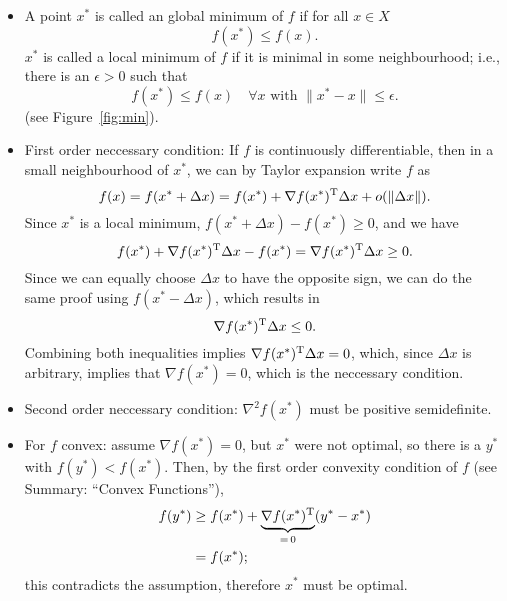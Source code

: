 \documentclass{article}
\begin{document}
\begin{itemize}
\item A point \(x^*\) is called an global minimum of \(f\) if for all \(x \in X\)
  \begin{equation*}
    f(x^*) \leq f(x).
  \end{equation*}
  \(x^*\) is called a local minimum of \(f\) if it is minimal in some neighbourhood; i.e., there is
  an \(\epsilon > 0\) such that
  \begin{equation*}
    f(x^*) \leq f(x) \quad \forall x \text{ with } \lVert x^* - x \rVert \leq \epsilon.
  \end{equation*}
  (see Figure~\ref{fig:min}).
\item First order neccessary condition: If \(f\) is continuously differentiable, then in a small
  neighbourhood of \(x^*\), we can by Taylor expansion write \(f\) as
  \begin{equation*}
    f(x) = f(x^* + \Delta x) = f(x^*) + \nabla f(x^*)^{\mathrm{T}} \Delta x + o(\lVert \Delta x \rVert).
  \end{equation*}
  Since \(x^*\) is a local minimum, \(f(x^* + \Delta x) - f(x^*) \geq 0\), and we have
  \begin{equation*}
    f(x^*) + \nabla f(x^*)^{\mathrm{T}} \Delta x - f(x^*) = \nabla f(x^*)^{\mathrm{T}} \Delta x \geq 0.
  \end{equation*}
  Since we can equally choose \(\Delta x\) to have the opposite sign, we can do the same proof using
  \(f(x^* - \Delta x)\), which results in
  \begin{equation*}
    \nabla f(x^*)^{\mathrm{T}} \Delta x \leq 0.
  \end{equation*}
  Combining both inequalities implies \(\nabla f(x^*)^{\mathrm{T}} \Delta x = 0\), which, since \(\Delta x\)
  is arbitrary, implies that \(\nabla f(x^*) = 0\), which is the neccessary condition.
\item Second order neccessary condition: \(\nabla^2 f(x^*)\) must be positive semidefinite.
\item For \(f\) convex: assume \(\nabla f(x^*) = 0\), but \(x^*\) were not optimal, so there is a
  \(y^*\) with \(f(y^*) < f(x^*)\).  Then, by the first order convexity condition of \(f\) (see
  Summary: ``Convex Functions''),
\begin{align*}
  f(y^*) &\geq f(x^*) + \underbrace{\nabla f(x^*)^{\mathrm{T}}}_{=\, 0}(y^* - x^*) \\
         &= f(x^*);
\end{align*}
this contradicts the assumption, therefore \(x^*\) must be optimal.
\end{itemize}
\end{document}
